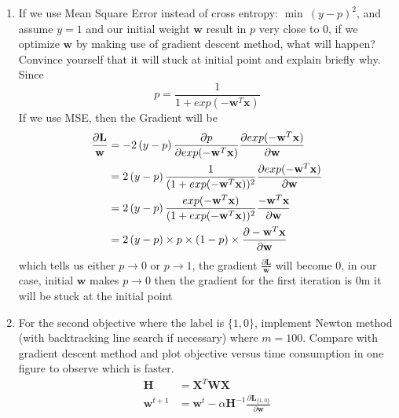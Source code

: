 \documentclass[11pt]{article}
\newcommand{\mtx}[1]{\mathbf{#1}}
\newcommand{\vct}[1]{\mathbf{#1}}
\def \mL {\mtx{L}}
\def \mX {\mtx{X}}
\def \vw {\vct{w}}
\def \vx {\vct{x}}
\begin{document}
\begin{enumerate}
	\item If we use Mean Square Error instead of cross entropy: $\min \ (y-p)^2$, and assume $y=1$ and our initial weight $\vw$ result in $p$ very close to 0, if we optimize $\vw$ by making use of gradient descent method, what will happen? Convince yourself that it will stuck at initial point and explain briefly why.
	\\
	\newline
	Since $$p = \frac{1}{1+exp(-\vw^T\vx)}$$
	If we use MSE, then the Gradient will be
	\begin{align}
		\frac{\partial \mL}{\vw} &= -2\left(y- p\right)\frac{\partial p}{\partial exp(-\vw^T\vx)}\frac{\partial exp(-\vw^T\vx)}{\partial \vw} \notag\\
		&=2\left(y- p\right) \frac{1}{ (1+exp(-\vw^T\vx))^2}\frac{\partial exp(-\vw^T\vx)}{\partial \vw}\notag\\
		&=2\left(y- p\right) \frac{exp(-\vw^T\vx)}{ (1+exp(-\vw^T\vx))^2}\frac{-\vw^T\vx}{\partial \vw}\notag\\
		&=2\left(y- p\right)\times p\times (1-p)\times\frac{\partial-\vw^T\vx}{\partial \vw}\notag
	\end{align}
	which tells us either $p\rightarrow 0$ or $p\rightarrow 1$, the gradient $\frac{\partial \mL}{\vw}$ will become $0$,
	in our case, initial $\vw$ makes $p\rightarrow 0$ then the gradient for the first iteration is $0$m it will be stuck at the initial point
	
	\item For the second objective where the label is $\{1,0\}$, implement Newton method (with backtracking line search if necessary) where $m=100$.  Compare with gradient descent method and plot objective versus time consumption in one figure to observe which is faster.
	\begin{align}
		\mtx{H} &= \mX^T\mtx{W}\mX\\
		\vw^{t+1} &= \vw^t-\alpha\mtx{H}^{-1}\frac{\partial \mL_{\{1,0\}}}{\partial \vw}
	\end{align}


\end{enumerate}
\end{document}
